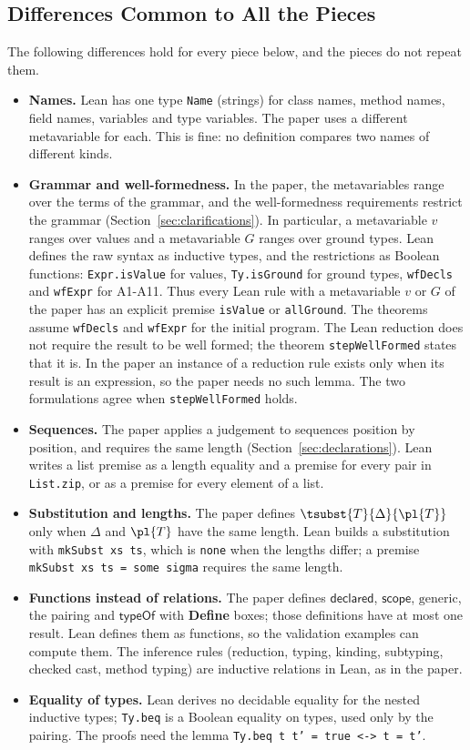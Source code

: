 \subsection{Differences Common to All the Pieces}
\label{app:lean:common}
The following differences hold for every piece below, and the pieces do not repeat them.
\begin{itemize}
\item \textbf{Names.}
Lean has one type \texttt{Name} (strings) for class names, method names, field names, variables and type variables.
The paper uses a different metavariable for each.
This is fine: no definition compares two names of different kinds.
\item \textbf{Grammar and well-formedness.}
In the paper, the metavariables range over the terms of the grammar, and the well-formedness requirements restrict the grammar (Section~\ref{sec:clarifications}).
In particular, a metavariable $v$ ranges over values and a metavariable $G$ ranges over ground types.
Lean defines the raw syntax as inductive types, and the restrictions as Boolean functions:
\texttt{Expr.isValue} for values, \texttt{Ty.isGround} for ground types, \texttt{wfDecls} and \texttt{wfExpr} for A1-A11.
Thus every Lean rule with a metavariable $v$ or $G$ of the paper has an explicit premise \texttt{isValue} or \texttt{allGround}.
The theorems assume \texttt{wfDecls} and \texttt{wfExpr} for the initial program.
The Lean reduction does not require the result to be well formed; the theorem \texttt{stepWellFormed} states that it is.
In the paper an instance of a reduction rule exists only when its result is an expression, so the paper needs no such lemma.
The two formulations agree when \texttt{stepWellFormed} holds.
\item \textbf{Sequences.}
The paper applies a judgement to sequences position by position, and requires the same length (Section~\ref{sec:declarations}).
Lean writes a list premise as a length equality and a premise for every pair in \texttt{List.zip}, or as a premise for every element of a list.
\item \textbf{Substitution and lengths.}
The paper defines $\tsubst{T}{\Delta}{\pl{T}}$ only when $\Delta$ and $\pl{T}$ have the same length.
Lean builds a substitution with \texttt{mkSubst xs ts}, which is \texttt{none} when the lengths differ; a premise \texttt{mkSubst xs ts = some sigma} requires the same length.
\item \textbf{Functions instead of relations.}
The paper defines $\mathsf{declared}$, $\mathsf{scope}$, $\mathrm{generic}$, the pairing and $\mathsf{typeOf}$ with \textbf{Define} boxes; those definitions have at most one result.
Lean defines them as functions, so the validation examples can compute them.
The inference rules (reduction, typing, kinding, subtyping, checked cast, method typing) are inductive relations in Lean, as in the paper.
\item \textbf{Equality of types.}
Lean derives no decidable equality for the nested inductive types; \texttt{Ty.beq} is a Boolean equality on types, used only by the pairing.
The proofs need the lemma \texttt{Ty.beq t t' = true <-> t = t'}.
\end{itemize}

